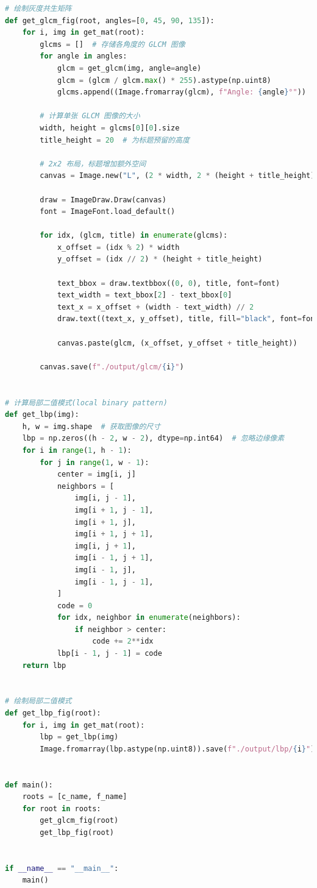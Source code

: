 \documentclass[a4paper,12pt]{report}
\begin{document}
\begin{lstlisting}[language=Python]
# 绘制灰度共生矩阵
def get_glcm_fig(root, angles=[0, 45, 90, 135]):
    for i, img in get_mat(root):
        glcms = []  # 存储各角度的 GLCM 图像
        for angle in angles:
            glcm = get_glcm(img, angle=angle)
            glcm = (glcm / glcm.max() * 255).astype(np.uint8)
            glcms.append((Image.fromarray(glcm), f"Angle: {angle}°"))  # 保存图像和标题

        # 计算单张 GLCM 图像的大小
        width, height = glcms[0][0].size
        title_height = 20  # 为标题预留的高度

        # 2x2 布局，标题增加额外空间
        canvas = Image.new("L", (2 * width, 2 * (height + title_height)), "white")

        draw = ImageDraw.Draw(canvas)
        font = ImageFont.load_default()

        for idx, (glcm, title) in enumerate(glcms):
            x_offset = (idx % 2) * width
            y_offset = (idx // 2) * (height + title_height)

            text_bbox = draw.textbbox((0, 0), title, font=font)
            text_width = text_bbox[2] - text_bbox[0]
            text_x = x_offset + (width - text_width) // 2
            draw.text((text_x, y_offset), title, fill="black", font=font)

            canvas.paste(glcm, (x_offset, y_offset + title_height))

        canvas.save(f"./output/glcm/{i}")


# 计算局部二值模式(local binary pattern)
def get_lbp(img):
    h, w = img.shape  # 获取图像的尺寸
    lbp = np.zeros((h - 2, w - 2), dtype=np.int64)  # 忽略边缘像素
    for i in range(1, h - 1):
        for j in range(1, w - 1):
            center = img[i, j]
            neighbors = [
                img[i, j - 1],
                img[i + 1, j - 1],
                img[i + 1, j],
                img[i + 1, j + 1],
                img[i, j + 1],
                img[i - 1, j + 1],
                img[i - 1, j],
                img[i - 1, j - 1],
            ]
            code = 0
            for idx, neighbor in enumerate(neighbors):
                if neighbor > center:
                    code += 2**idx
            lbp[i - 1, j - 1] = code
    return lbp


# 绘制局部二值模式
def get_lbp_fig(root):
    for i, img in get_mat(root):
        lbp = get_lbp(img)
        Image.fromarray(lbp.astype(np.uint8)).save(f"./output/lbp/{i}")


def main():
    roots = [c_name, f_name]
    for root in roots:
        get_glcm_fig(root)
        get_lbp_fig(root)


if __name__ == "__main__":
    main()

\end{lstlisting}
\clearpage
\end{document}

